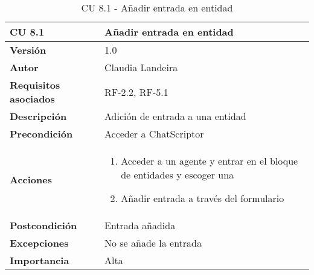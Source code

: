 \begin{table}[p]
	\centering
	\begin{tabularx}{\linewidth}{ p{} p{} }
		\toprule
		\textbf{CU 8.1}    & \textbf{Añadir entrada en entidad}\\
		\toprule
		\textbf{Versión}              & 1.0    \\
		\textbf{Autor}                & Claudia Landeira \\
		\textbf{Requisitos asociados} & RF-2.2, RF-5.1\\
		\textbf{Descripción}          & Adición de entrada a una entidad\\
		\textbf{Precondición}         & Acceder a ChatScriptor\\
		\textbf{Acciones}             &
		\begin{enumerate}
			\def\labelenumi{\arabic{enumi}.}
			\tightlist
                \item Acceder a un agente y entrar en el bloque de entidades y escoger una
                \item Añadir entrada a través del formulario
		\end{enumerate}\\
		\textbf{Postcondición}        & Entrada añadida  \\
		\textbf{Excepciones}          & No se añade la entrada \\
		\textbf{Importancia}          & Alta \\
		\bottomrule
	\end{tabularx}
	\caption{CU 8.1 - Añadir entrada en entidad}
\end{table}

